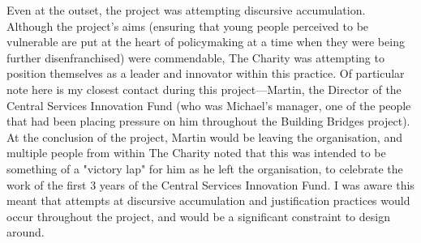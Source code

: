 Even at the outset, the project was attempting discursive accumulation. Although the project's aims (ensuring that young people perceived to be vulnerable are put at the heart of policymaking at a time when they were being further disenfranchised) were commendable, The Charity was attempting to position themselves as a leader and innovator within this practice. Of particular note here is my closest contact during this project—Martin, the Director of the Central Services Innovation Fund (who was Michael's manager, one of the people that had been placing pressure on him throughout the Building Bridges project). At the conclusion of the project, Martin would be leaving the organisation, and multiple people from within The Charity noted that this was intended to be something of a "victory lap" for him as he left the organisation, to celebrate the work of the first 3 years of the Central Services Innovation Fund. I was aware this meant that attempts at discursive accumulation and justification practices would occur throughout the project, and would be a significant constraint to design around. 

